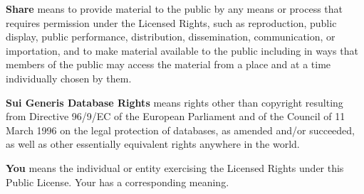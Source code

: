 \begin{myEnumerate}
    \item \textbf{Share} means to provide material to the public by any means or process that requires permission under the
    Licensed Rights, such as reproduction, public display, public performance, distribution, dissemination, communication, or
    importation, and to make material available to the public including in ways that members of the public may access the
    material from a place and at a time individually chosen by them.
    \item \textbf{Sui Generis Database Rights} means rights other than copyright resulting from Directive 96/9/EC of the
    European Parliament and of the Council of 11 March 1996 on the legal protection of databases, as amended and/or
    succeeded, as well as other essentially equivalent rights anywhere in the world.
    \item \textbf{You} means the individual or entity exercising the Licensed Rights under this Public License. Your has a
    corresponding meaning.
  \end{myEnumerate}

